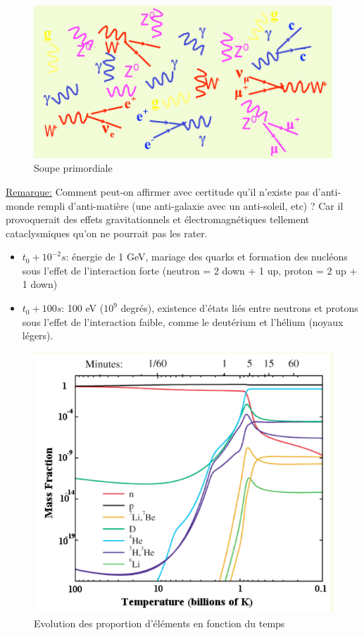 \begin{figure}[ht]
    \centering
    \includegraphics[scale=0.65]{Images1/soupe.png}
    \caption{Soupe primordiale}
    \label{fig:soupe_promordiale}
\end{figure}

\underline{Remarque:} Comment peut-on affirmer avec certitude qu'il n'existe pas d'anti-monde rempli d'anti-matière (une anti-galaxie avec un anti-soleil, etc) ? Car il provoquerait des effets gravitationnels et électromagnétiques tellement cataclysmiques qu'on ne pourrait pas les rater.

\begin{itemize}
    \item $t_0 + 10^{-2}s$: énergie de 1 GeV, mariage des quarks et formation des nucléons sous l'effet de l'interaction forte (neutron = 2 down + 1 up, proton = 2 up + 1 down)
    \item $t_0+100s$: 100 eV ($10^9$ degrés), existence d'états liés entre neutrons et protons sous l'effet de l'interaction faible, comme le deutérium et l'hélium (noyaux légers). 
\end{itemize}

\begin{figure}[ht]
    \centering
    \includegraphics[scale=0.50]{Images1/tempmass.png}
    \caption{Evolution des proportion d'éléments en fonction du temps}
\end{figure}

